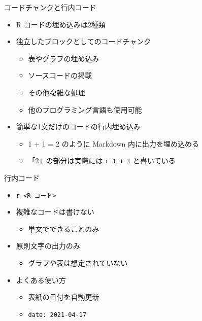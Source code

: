 \documentclass[
  ignorenonframetext,
]{beamer}
\providecommand{\tightlist}{%
  \setlength{\itemsep}{0pt}\setlength{\parskip}{0pt}}
\begin{document}
\begin{frame}[fragile]{コードチャンクと行内コード}
\protect\hypertarget{ux30b3ux30fcux30c9ux30c1ux30e3ux30f3ux30afux3068ux884cux5185ux30b3ux30fcux30c9}{}
\begin{itemize}
\tightlist
\item
  R コードの埋め込みは2種類
\item
  独立したブロックとしてのコードチャンク

  \begin{itemize}
  \tightlist
  \item
    表やグラフの埋め込み
  \item
    ソースコードの掲載
  \item
    その他複雑な処理
  \item
    他のプログラミング言語も使用可能
  \end{itemize}
\item
  簡単な1文だけのコードの行内埋め込み

  \begin{itemize}
  \tightlist
  \item
    1 + 1 = 2 のように Markdown 内に出力を埋め込める
  \item
    「2」の部分は実際には \texttt{\textasciigrave{}r\ 1\ +\ 1\textasciigrave{}}
    と書いている
  \end{itemize}
\end{itemize}
\end{frame}

\begin{frame}[fragile]{行内コード}
\protect\hypertarget{ux884cux5185ux30b3ux30fcux30c9}{}
\begin{itemize}
\item
  \texttt{\textasciigrave{}r\ \textless{}R\ コード\textgreater{}\textasciigrave{}}
\item
  複雑なコードは書けない

  \begin{itemize}
  \tightlist
  \item
    単文でできることのみ
  \end{itemize}
\item
  原則文字の出力のみ

  \begin{itemize}
  \tightlist
  \item
    グラフや表は想定されていない
  \end{itemize}
\item
  よくある使い方

  \begin{itemize}
  \tightlist
  \item
    表紙の日付を自動更新
  \item
    \texttt{date:\ 2021-04-17}
  \end{itemize}
\end{itemize}
\end{frame}
\end{document}
